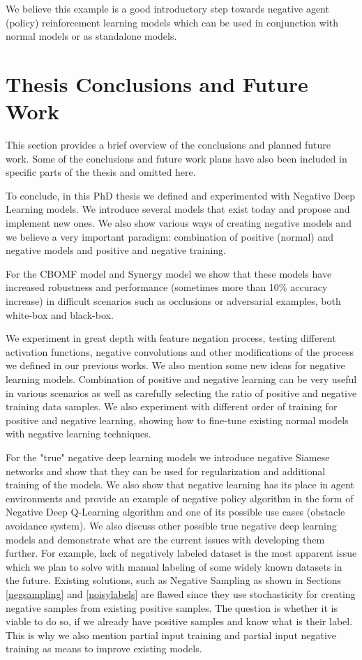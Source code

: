 \documentclass[b5paper]{book}
\begin{document}
We believe this example is a good introductory step towards negative agent (policy) reinforcement learning models which can be used in conjunction with normal models or as standalone models. 

\chapter{Thesis Conclusions and Future Work}

This section provides a brief overview of the conclusions and planned future work. Some of the conclusions and future work plans have also been included in specific parts of the thesis and omitted here.

To conclude, in this PhD thesis we defined and experimented with Negative Deep Learning models. We introduce several models that exist today and propose and implement new ones. We also show various ways of creating negative models and we believe a very important paradigm: combination of positive (normal) and negative models and positive and negative training.

For the CBOMF model and Synergy model we show that these models have increased robustness and performance (sometimes more than 10\% accuracy increase) in difficult scenarios such as occlusions or adversarial examples, both white-box and black-box.

We experiment in great depth with feature negation process, testing different activation functions, negative convolutions and other modifications of the process we defined in our previous works. We also mention some new ideas for negative learning models. Combination of positive and negative learning can be very useful in various scenarios as well as carefully selecting the ratio of positive and negative training data samples. We also experiment with different order of training for positive and negative learning, showing how to fine-tune existing normal models with negative learning techniques.

For the "true" negative deep learning models we introduce negative Siamese networks and show that they can be used for regularization and additional training of the models. We also show that negative learning has its place in agent environments and provide an example of negative policy algorithm in the form of Negative Deep Q-Learning algorithm and one of its possible use cases (obstacle avoidance system). We also discuss other possible true negative deep learning models and demonstrate what are the current issues with developing them further. For example, lack of negatively labeled dataset is the most apparent issue which we plan to solve with manual labeling of some widely known datasets in the future. Existing solutions, such as Negative Sampling as shown in Sections \ref{negsampling} and \ref{noisylabels} are flawed since they use stochasticity for creating negative samples from existing positive samples. The question is whether it is viable to do so, if we already have positive samples and know what is their label. This is why we also mention partial input training and partial input negative training as means to improve existing models.
\end{document}
